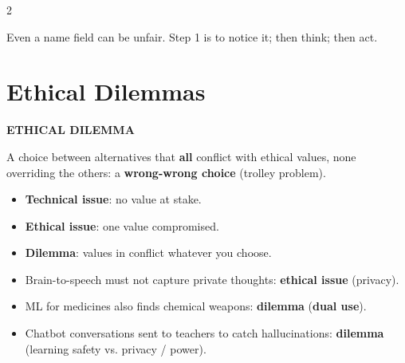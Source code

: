 \documentclass[a4paper,9pt]{extarticle}
\begin{document}
\begin{multicols}{2}
\begin{goat}

Even a name field can be unfair. Step 1 is to notice it; then think; then act.

\end{goat}



\section{Ethical Dilemmas}


\begin{definition}

\textbf{ETHICAL DILEMMA}

A choice between alternatives that \textbf{all} conflict with ethical values, none overriding
the others: a \textbf{wrong-wrong choice} (trolley problem).

\end{definition}


\begin{warning}

\begin{itemize}

\item \textbf{Technical issue}: no value at stake.

\item \textbf{Ethical issue}: one value compromised.

\item \textbf{Dilemma}: values in conflict whatever you choose.

\end{itemize}

\end{warning}


\begin{example}

\begin{itemize}

\item Brain-to-speech must not capture private thoughts: \textbf{ethical issue} (privacy).

\item ML for medicines also finds chemical weapons: \textbf{dilemma} (\textbf{dual use}).

\item Chatbot conversations sent to teachers to catch hallucinations: \textbf{dilemma}
(learning safety vs. privacy / power).


\end{itemize}
\end{example}
\end{multicols}
\end{document}
